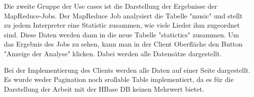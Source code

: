 Die zweite Gruppe der Use cases ist die Darstellung der Ergebnisse der MapReduce-Jobs.
Der MapReduce Job analysiert die Tabelle "music" und stellt zu jedem Interpreter eine Statistic zusammen, wie viele Lieder ihm zugeordnet sind. Diese Daten werden dann in die neue Tabelle "statictics" zusammen. Um das Ergebnis des Jobs zu sehen, kann man in der Client Oberfläche den Button "Anzeige der Analyse" klicken. Dabei werden alle Datensätze dargestellt.

Bei der Implementierung des Clients werden alle Daten auf einer Seite dargestellt. Es wurde weder  Pagination noch srollable Table implementiert, da es für die Darstellung der Arbeit mit der HBase DB keinen Mehrwert bietet.


